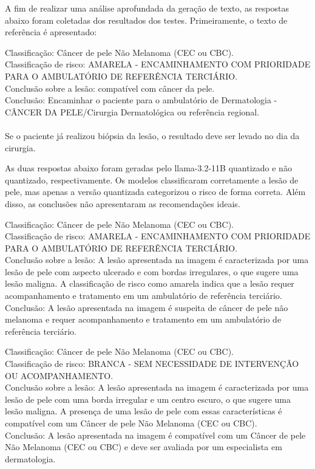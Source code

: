 A fim de realizar uma análise aprofundada da geração de texto, as respostas abaixo foram coletadas dos resultados dos
testes. Primeiramente, o texto de referência é apresentado:

\begin{dialogue}
     Classificação: Câncer de pele Não Melanoma (CEC ou CBC). \\
    Classificação de risco: AMARELA - ENCAMINHAMENTO COM PRIORIDADE PARA O AMBULATÓRIO DE REFERÊNCIA TERCIÁRIO. \\
    Conclusão sobre a lesão: compatível com câncer da pele. \\
    Conclusão: Encaminhar o paciente para o ambulatório de Dermatologia - CÂNCER DA PELE/Cirurgia Dermatológica ou
    referência regional. \\ \\
    Se o paciente já realizou biópsia da lesão, o resultado deve ser levado no dia da cirurgia.
\end{dialogue}

As duas respostas abaixo foram geradas pelo \ac{llama}-3.2-11B quantizado e não quantizado, respectivamente. Os modelos
classificaram corretamente a lesão de pele, mas apenas a versão quantizada categorizou o risco de forma correta. Além
disso, as conclusões não apresentaram as recomendações ideais.

\begin{dialogue}
     Classificação: Câncer de pele Não Melanoma (CEC ou CBC). \\
    Classificação de risco: AMARELA - ENCAMINHAMENTO COM PRIORIDADE PARA O AMBULATÓRIO DE REFERÊNCIA TERCIÁRIO. \\
    Conclusão sobre a lesão: A lesão apresentada na imagem é caracterizada por uma lesão de pele com aspecto ulcerado e
    com bordas irregulares, o que sugere uma lesão maligna. A classificação de risco como amarela indica que a lesão
    requer
    acompanhamento e tratamento em um ambulatório de referência terciário. \\
    Conclusão: A lesão apresentada na imagem é suspeita de câncer de pele não melanoma e requer acompanhamento e
    tratamento em um ambulatório de referência terciário.
\end{dialogue}

\begin{dialogue}
     Classificação: Câncer de pele Não Melanoma (CEC ou CBC). \\
    Classificação de risco: BRANCA - SEM NECESSIDADE DE INTERVENÇÃO OU ACOMPANHAMENTO. \\
    Conclusão sobre a lesão: A lesão apresentada na imagem é caracterizada por uma lesão de pele com uma borda
    irregular e um centro escuro, o que sugere uma lesão maligna. A presença de uma lesão de pele com essas
    características
    é compatível com um Câncer de pele Não Melanoma (CEC ou CBC). \\
    Conclusão: A lesão apresentada na imagem é compatível com um Câncer de pele Não Melanoma (CEC ou CBC) e deve ser
    avaliada por um especialista em dermatologia.
\end{dialogue}

